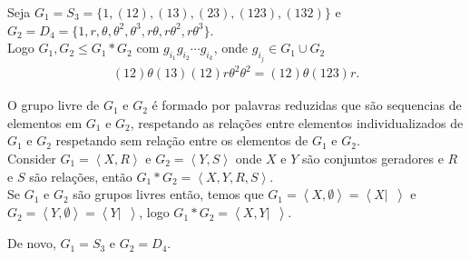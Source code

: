 \begin{example}
  Seja $G_1=S_3=\{1,(12),(13),(23),(123),(132)\}$ e\\ $G_2=D_{4}=\{1,r,\theta,\theta^{2},\theta^{3},r\theta,r\theta^{2},r\theta^{3}\}$.\\
  Logo $G_1,G_2\leq G_1*G_2$ com $g_{i_1}g_{i_2}\cdots g_{i_k}$, onde $g_{i_j}\in G_1\cup G_2$
  \begin{align*}
    (12)\theta(13)(12)r\theta^{2}\theta^2=(12)\theta(123)r.
  \end{align*}
\end{example}
O grupo livre de $G_1$ e $G_2$ é formado por palavras reduzidas que são sequencias de elementos em $G_1$ e $G_2$, respetando as relações entre elementos individualizados de $G_1$ e $G_2$ respetando sem relação entre os elementos de $G_1$ e $G_2$.\\
Consider $G_1=\left\langle X,R \right\rangle$ e $G_2=\left\langle Y,S \right\rangle$ onde $X$ e $Y$ são conjuntos geradores e $R$ e $S$ são relações, então $G_1*G_2=\left\langle X,Y,R,S \right\rangle$.\\
Se $G_1$ e $G_2$ são grupos livres então, temos que $G_1=\left\langle X,\emptyset \right\rangle=\left\langle X|\phantom{\emptyset} \right\rangle$ e $G_2=\left\langle Y,\emptyset \right\rangle=\left\langle Y|\phantom{\emptyset} \right\rangle$, logo $G_1*G_2=\left\langle X,Y|\phantom{\emptyset} \right\rangle$.
\begin{example}
  De novo, $G_1=S_3$ e $G_2=D_4$. 
\end{example}

